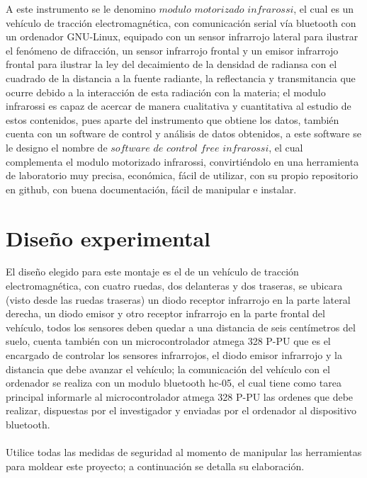 \documentclass[12]{article}
\begin{document}
\begin{multicols}{2}
A este instrumento se le denomino $modulo$ $motorizado$ $infrarossi$, el cual es un vehículo de tracción electromagnética, con comunicación serial vía bluetooth con un ordenador GNU-Linux, equipado con un sensor infrarrojo lateral para ilustrar el fenómeno de difracción, un sensor infrarrojo frontal y un emisor infrarrojo frontal para ilustrar la ley del decaimiento de  la densidad de radiansa con el cuadrado de la distancia a la fuente radiante,  la reflectancia y  transmitancia que ocurre debido a la interacción de esta radiación con la materia; el modulo infrarossi es capaz de acercar de manera cualitativa y cuantitativa al estudio de estos contenidos, pues aparte del instrumento que obtiene los datos, también cuenta con un software de control   y análisis de datos obtenidos, a este software se le designo el nombre de $software$ $de$ $control$ $free$ $infrarossi$, el cual complementa el modulo motorizado infrarossi, convirtiéndolo en una herramienta de laboratorio muy precisa, económica, fácil de utilizar, con su propio repositorio en github, con buena  documentación, fácil de manipular e instalar.
\section{Diseño experimental}
El diseño elegido para este montaje es el de un vehículo de tracción electromagnética, con cuatro ruedas,  dos delanteras y dos traseras, se ubicara (visto desde las ruedas traseras) un diodo receptor infrarrojo en la parte lateral derecha, un diodo emisor y otro receptor infrarrojo en la parte frontal del vehículo, todos los sensores deben quedar a una distancia de seis  centímetros  del suelo, cuenta también con un microcontrolador atmega 328 P-PU que es el encargado de controlar los sensores infrarrojos, el diodo emisor infrarrojo y la distancia que debe avanzar el vehículo; la comunicación del vehículo con el ordenador se realiza con un modulo bluetooth hc-05, el cual tiene como tarea principal informarle al microcontrolador atmega 328 P-PU las ordenes que debe realizar, dispuestas por el investigador y enviadas por el ordenador al dispositivo bluetooth.\\\\
Utilice todas las medidas de seguridad al momento de manipular las herramientas para moldear este proyecto; a continuación se detalla su elaboración.

\end{multicols}
\end{document}
